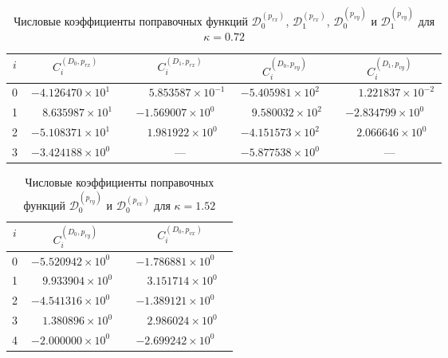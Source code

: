 \begin{table}[htbp]
	\centering
	\caption{Числовые коэффициенты поправочных функций $\mathcal D_0^{(p_{rx})}$, $\mathcal D_1^{(p_{rx})}$, $\mathcal D_0^{(p_{vy})}$ и $\mathcal D_1^{(p_{vy})}$ для $\kappa = 0.72$}
	\label{tab:appendixB_D_pair2_k072}
	\begin{tabular}{|c|c|c|c|c|}
		\hline
		$i$ & $C_i^{(D_0,p_{rx})}$ & $C_i^{(D_1,p_{rx})}$ & $C_i^{(D_0,p_{vy})}$ & $C_i^{(D_1,p_{vy})}$ \\
		\hline
		0 & $-4.126470\times10^{1\phantom{-}}$ & $\phantom{-}5.853587\times10^{-1}$ & $-5.405981\times10^{2\phantom{-}}$ & $\phantom{-}1.221837\times10^{-2}$ \\
		1 & $\phantom{-}8.635987\times10^{1\phantom{-}}$ & $-1.569007\times10^{0\phantom{-}}$ & $\phantom{-}9.580032\times10^{2\phantom{-}}$ & $-2.834799\times10^{0\phantom{-}}$ \\
		2 & $-5.108371\times10^{1\phantom{-}}$ & $\phantom{-}1.981922\times10^{0\phantom{-}}$ & $-4.151573\times10^{2\phantom{-}}$ & $\phantom{-}2.066646\times10^{0\phantom{-}}$ \\
		3 & $-3.424188\times10^{0\phantom{-}}$ & --- & $-5.877538\times10^{0\phantom{-}}$ & --- \\
		\hline
	\end{tabular}
\end{table}

\begin{table}[htbp]
	\centering
	\caption{Числовые коэффициенты поправочных функций $\mathcal D_0^{(p_{ry})}$ и $\mathcal D_0^{(p_{vx})}$ для $\kappa = 1.52$}
	\label{tab:appendixB_D_pair1_k152}
	\begin{tabular}{|c|c|c|}
		\hline
		$i$ & $C_i^{(D_0,p_{ry})}$ & $C_i^{(D_0,p_{vx})}$ \\
		\hline
		0 & $-5.520942\times10^{0\phantom{-}}$ & $-1.786881\times10^{0\phantom{-}}$ \\
		1 & $\phantom{-}9.933904\times10^{0\phantom{-}}$ & $\phantom{-}3.151714\times10^{0\phantom{-}}$ \\
		2 & $-4.541316\times10^{0\phantom{-}}$ & $-1.389121\times10^{0\phantom{-}}$ \\
		3 & $\phantom{-}1.380896\times10^{0\phantom{-}}$ & $\phantom{-}2.986024\times10^{0\phantom{-}}$ \\
		4 & $-2.000000\times10^{0\phantom{-}}$ & $-2.699242\times10^{0\phantom{-}}$ \\
		\hline
	\end{tabular}
\end{table}

